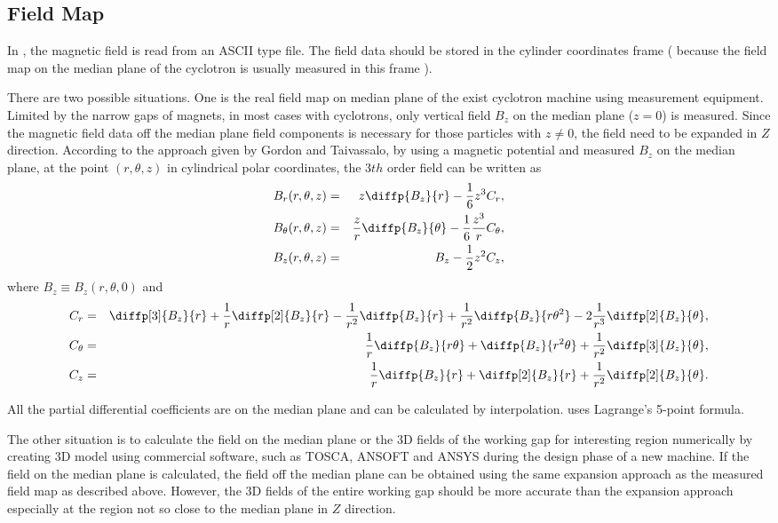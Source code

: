 \subsection{Field Map}
\label{sec:opalcycl:fildmap}
In \opalcycl, the magnetic field is read from an ASCII type file. The field data should be stored in the cylinder coordinates frame
( because the field map on the median plane of the cyclotron is usually measured in this frame ).

There are two possible situations. One is the real field map on median plane of the exist cyclotron machine using measurement equipment.
Limited by the narrow gaps of magnets, in most cases with cyclotrons, only vertical field $B_z$ on the median plane ($z=0$) is measured.
Since the magnetic field data off the median plane field components is necessary for those particles with $z \neq 0$, the field need to be expanded in $Z$ direction.
According to the approach given by Gordon and Taivassalo, by using a magnetic potential and measured $B_z$ on the median plane,
at the point $(r,\theta, z)$ in cylindrical polar coordinates, the 3$th$ order field can be written as
\begin{eqnarray}\label{eq:Bfield}
  B_r(r,\theta, z) & = & z\diffp{B_z}{r}-\frac{1}{6}z^3 C_r, \nonumber\\
  B_\theta(r,\theta, z) & = & \frac{z}{r}\diffp{B_z}{\theta}-\frac{1}{6}\frac{z^3}{r} C_{\theta}, \\
  B_z(r,\theta, z) & = & B_z-\frac{1}{2}z^2 C_z,  \nonumber
\end{eqnarray}
where $B_z\equiv B_z(r, \theta, 0)$ and
\begin{eqnarray}\label{eq:Bcoeff}
  C_r & = & \diffp[3]{B_z}{r} + \frac{1}{r}\diffp[2]{B_z}{r} - \frac{1}{r^2}\diffp{B_z}{r}
        + \frac{1}{r^2}\diffp{B_z}{{r}{\theta^2}} - 2\frac{1}{r^3}\diffp[2]{B_z}{\theta}, \nonumber  \\
  C_{\theta} & = & \frac{1}{r}\diffp{B_z}{{r}{\theta}} + \diffp{B_z}{{r^2}{\theta}}
        + \frac{1}{r^2}\diffp[3]{B_z}{\theta},  \\
  C_z & = & \frac{1}{r}\diffp{B_z}{r} + \diffp[2]{B_z}{r} + \frac{1}{r^2}\diffp[2]{B_z}{\theta}. \nonumber
\end{eqnarray}

All the partial differential coefficients are on the median plane and can be calculated by interpolation. \opalcycl uses  Lagrange's  5-point formula.

The other situation is to calculate the field on the median plane or the 3D fields of the working gap for interesting region numerically by creating 3D model using commercial software,
such as TOSCA, ANSOFT and ANSYS during the design phase of a new machine. If the field on the median plane is calculated, the field off the median plane can be obtained using
the same expansion approach as the measured field map as described above. However, the 3D fields of the entire working gap should be more accurate than
the expansion approach  especially at the region not so close to the median plane in $Z$ direction.

